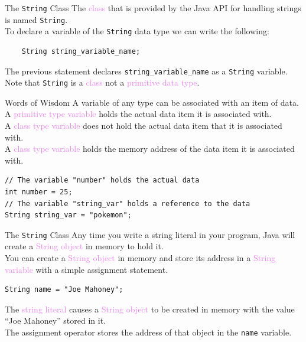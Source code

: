 \documentclass[11pt]{beamer}
\newcommand{\violet}[1]{\textcolor{violet}{#1}}
\begin{document}
\begin{frame}[fragile]{The \texttt{String} Class}
    The \violet{class} that is provided by the Java API for handling strings is named \texttt{String}. \\ \vspace{1em}
    To declare a variable of the \texttt{String} data type we can write the following:
    \begin{lstlisting}
    String string_variable_name;
    \end{lstlisting}
    The previous statement declares \texttt{string\_variable\_name} as a \texttt{String} variable. \\ \vspace{1em}
    Note that \texttt{String} is a \violet{class} not a \violet{primitive data type}.
\end{frame}

\begin{frame}[fragile]{Words of Wisdom}
    A variable of any type can be associated with an item of data. \\ \vspace{1em}
    A \violet{primitive type variable} holds the actual data item it is associated with. \\ \vspace{1em}
    A \violet{class type variable} does not hold the actual data item that it is associated with. \\ \vspace{1em}
    A \violet{class type variable} holds the memory address of the data item it is associated with. \\ \vspace{1em}
    \begin{lstlisting}
// The variable "number" holds the actual data
int number = 25;
// The variable "string_var" holds a reference to the data
String string_var = "pokemon";
    \end{lstlisting}
\end{frame}

\begin{frame}[fragile]{The \texttt{String} Class}
    Any time you write a string literal in your program, Java will create a \violet{String object} in memory to hold it. \\ \vspace{1em}
    You can create a \violet{String object} in memory and store its address in a \violet{String variable} with a simple assignment statement.
    \begin{lstlisting}
String name = "Joe Mahoney";
    \end{lstlisting}
    The \violet{string literal} causes a \violet{String object} to be created in memory with the value ``Joe Mahoney'' stored in it. \\ \vspace{1em}
    The assignment operator stores the address of that object in the \texttt{name} variable.
\end{frame}
\end{document}
